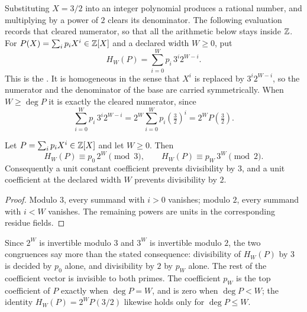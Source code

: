 \documentclass[11pt]{article}
\begin{document}
Substituting \(X=3/2\) into an integer polynomial produces a rational number,
and multiplying by a power of \(2\) clears its denominator.  The following
evaluation records that cleared numerator, so that all the arithmetic below
stays inside \(\mathbb{Z}\).  For \(P(X)=\sum_i p_iX^i\in\mathbb{Z}[X]\) and a declared width
\(W\ge0\), put
\[
 H_W(P)=\sum_{i=0}^{W}p_i\,3^i2^{W-i}.
\]
This is the
.  It is homogeneous in the sense that \(X^{i}\) is
replaced by \(3^{i}2^{W-i}\), so the numerator and the denominator of the base
are carried symmetrically.  When \(W\ge\deg P\) it is exactly the cleared
numerator, since
\[
 \sum_{i=0}^{W}p_i\,3^i2^{W-i}=2^{W}\sum_{i=0}^{W}p_i\left(\tfrac32\right)^{i}
 =2^{W}P\!\left(\tfrac32\right).
\]

\begin{theorem}\label{long1049:res:endpoints}
Let \(P=\sum_ip_iX^i\in\mathbb{Z}[X]\) and let \(W\ge0\).  Then
\[
 H_W(P)\equiv p_0\,2^W\pmod 3,\qquad
 H_W(P)\equiv p_W\,3^W\pmod 2.
\]
Consequently a unit constant coefficient prevents divisibility by \(3\), and
a unit coefficient at the declared width \(W\) prevents divisibility by \(2\).
\end{theorem}

\begin{proof}
Modulo \(3\), every summand with \(i>0\) vanishes; modulo \(2\), every summand
with \(i<W\) vanishes.  The remaining powers are units in the corresponding
residue fields.
\end{proof}

Since \(2^{W}\) is invertible modulo \(3\) and \(3^{W}\) is invertible modulo
\(2\), the two congruences say more than the stated consequence: divisibility
of \(H_W(P)\) by \(3\) is decided by \(p_0\) alone, and divisibility by \(2\) by
\(p_W\) alone.  The rest of the coefficient vector is invisible to both primes.
The coefficient \(p_W\) is the top coefficient of \(P\) exactly when
\(\deg P=W\), and is zero when \(\deg P<W\); the identity
\(H_W(P)=2^{W}P(3/2)\) likewise holds only for \(\deg P\le W\).
\end{document}
